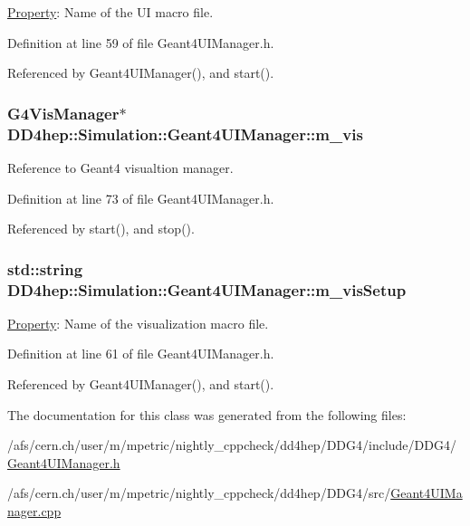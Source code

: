 \hyperlink{class_d_d4hep_1_1_property}{Property}: Name of the UI macro file. 

Definition at line 59 of file Geant4UIManager.h.

Referenced by Geant4UIManager(), and start().\hypertarget{class_d_d4hep_1_1_simulation_1_1_geant4_u_i_manager_a5c333e63d3fb38d0196d075ddac79fff}{
\subsubsection[{m\_\-vis}]{\setlength{\rightskip}{0pt plus 5cm}G4VisManager$\ast$ {\bf DD4hep::Simulation::Geant4UIManager::m\_\-vis}}}
\label{class_d_d4hep_1_1_simulation_1_1_geant4_u_i_manager_a5c333e63d3fb38d0196d075ddac79fff}


Reference to Geant4 visualtion manager. 

Definition at line 73 of file Geant4UIManager.h.

Referenced by start(), and stop().\hypertarget{class_d_d4hep_1_1_simulation_1_1_geant4_u_i_manager_aa1bdcdb2a02479af8627ea0ba6d12f69}{
\subsubsection[{m\_\-visSetup}]{\setlength{\rightskip}{0pt plus 5cm}std::string {\bf DD4hep::Simulation::Geant4UIManager::m\_\-visSetup}}}
\label{class_d_d4hep_1_1_simulation_1_1_geant4_u_i_manager_aa1bdcdb2a02479af8627ea0ba6d12f69}


\hyperlink{class_d_d4hep_1_1_property}{Property}: Name of the visualization macro file. 

Definition at line 61 of file Geant4UIManager.h.

Referenced by Geant4UIManager(), and start().

The documentation for this class was generated from the following files:\begin{DoxyCompactItemize}
\item 
/afs/cern.ch/user/m/mpetric/nightly\_\-cppcheck/dd4hep/DDG4/include/DDG4/\hyperlink{_geant4_u_i_manager_8h}{Geant4UIManager.h}\item 
/afs/cern.ch/user/m/mpetric/nightly\_\-cppcheck/dd4hep/DDG4/src/\hyperlink{_geant4_u_i_manager_8cpp}{Geant4UIManager.cpp}\end{DoxyCompactItemize}
